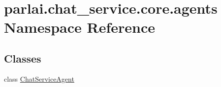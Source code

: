 \hypertarget{namespaceparlai_1_1chat__service_1_1core_1_1agents}{}\section{parlai.\+chat\+\_\+service.\+core.\+agents Namespace Reference}
\label{namespaceparlai_1_1chat__service_1_1core_1_1agents}
\subsection*{Classes}
\begin{DoxyCompactItemize}
\item 
class \hyperlink{classparlai_1_1chat__service_1_1core_1_1agents_1_1ChatServiceAgent}{Chat\+Service\+Agent}
\end{DoxyCompactItemize}
